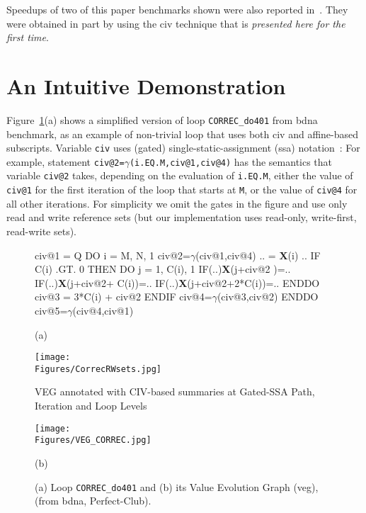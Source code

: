 \documentclass[10pt,nocopyrightspace]{sigplanconf}
\newcommand{\mymath}[1]{$ #1 $}
\newcommand{\Figures}[1]{../Figures/}
\begin{document}
Speedups of two of this paper benchmarks shown were also reported 
in~\cite{CosPLDI}. They were obtained in part by using the {\sc civ} 
technique that is {\em presented here for the first time}.


\section{An Intuitive Demonstration}
\label{Intro:RelAppLim}

Figure~\ref{fig:codeActforCorrec}(a) shows a simplified version of
loop {\tt CORREC\_do401} from {\sc bdna} benchmark, 
as an example of non-trivial loop that uses both {\sc civ} and affine-based
subscripts.   Variable {\tt civ}  uses (gated) 
single-static-assignment ({\sc ssa}) notation~\cite{GatedSSA}: 
%
For example, statement {\tt civ@2=$\gamma$(i.EQ.M,civ@1,civ@4)}
has the semantics that variable {\tt civ@2} takes, depending 
on the evaluation of {\tt i.EQ.M}, either the value of {\tt civ@1} for 
the first iteration of the loop that starts at {\tt M}, or the value of 
{\tt civ@4} for all other iterations. For simplicity we omit the gates 
in the figure and use only read and write reference sets
(but our implementation uses read-only, write-first, read-write sets).

\begin{figure}
\begin{minipage}{0.49\columnwidth}
\begin{colorcode}
civ@1 = Q
DO i = M, N, 1
 civ@2=\mymath{\gamma}(civ@1,civ@4)
 .. = {\bf X}(i) ..
 IF C(i) .GT. 0 THEN
  DO j = 1, C(i), 1
   IF(..){\bf{}X}(j+civ@2       )=..
   IF(..){\bf{}X}(j+civ@2+  C(i))=..
   IF(..){\bf{}X}(j+civ@2+2*C(i))=..
  ENDDO
  civ@3 = 3*C(i) + civ@2
 ENDIF
 civ@4=\mymath{\gamma}(civ@3,civ@2)
ENDDO
civ@5=\mymath{\gamma}(civ@4,civ@1)
  
            (a)
\end{colorcode}
\hspace{2ex}\texttt{[image: \\Figures/CorrecRWsets.jpg]}
\end{minipage}
\begin{minipage}{0.45\columnwidth}
\begin{colorcode}
      VEG annotated with 
      CIV-based summaries 
      at Gated-SSA Path, 
         Iteration and 
         Loop Levels
\end{colorcode}
\texttt{[image: \\Figures/VEG\_CORREC.jpg]}
\begin{colorcode}
                (b)
\end{colorcode}
\end{minipage}
\caption{(a) Loop {\tt CORREC\_do401} and (b) its Value Evolution Graph ({\sc veg}),
                (from {\sc bdna}, {\sc Perfect-Club}).}
\label{fig:codeActforCorrec}
\end{figure}
\end{document}
